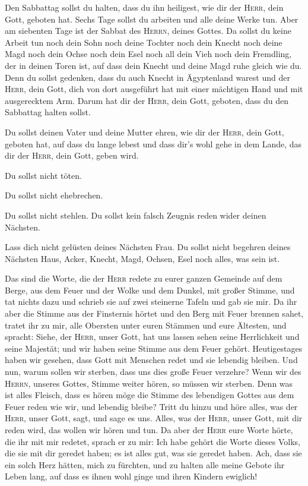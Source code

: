  Den Sabbattag sollst du halten, dass du ihn heiligest,
wie dir der \textsc{Herr}, dein Gott, geboten hat.  Sechs
Tage sollst du arbeiten und alle deine Werke tun.  Aber
am siebenten Tage ist der Sabbat des \textsc{Herrn}, deines Gottes. Da
sollst du keine Arbeit tun noch dein Sohn noch deine Tochter noch dein
Knecht noch deine Magd noch dein Ochse noch dein Esel noch all dein Vieh
noch dein Fremdling, der in deinen Toren ist, auf dass dein Knecht und
deine Magd ruhe gleich wie du.  Denn du sollst gedenken,
dass du auch Knecht in Ägyptenland warest und der \textsc{Herr}, dein
Gott, dich von dort ausgeführt hat mit einer mächtigen Hand und mit
ausgerecktem Arm. Darum hat dir der \textsc{Herr}, dein Gott, geboten,
dass du den Sabbattag halten sollst.

 Du sollst deinen Vater und deine Mutter ehren, wie dir
der \textsc{Herr}, dein Gott, geboten hat, auf dass du lange lebest und
dass dir's wohl gehe in dem Lande, das dir der \textsc{Herr}, dein Gott,
geben wird.

 Du sollst nicht töten.

 Du sollst nicht ehebrechen.

 Du sollst nicht stehlen.  Du sollst kein
falsch Zeugnis reden wider deinen Nächsten.

 Lass dich nicht gelüsten deines Nächsten Frau. Du sollst
nicht begehren deines Nächsten Haus, Acker, Knecht, Magd, Ochsen, Esel
noch alles, was sein ist.

 Das sind die Worte, die der \textsc{Herr} redete zu
eurer ganzen Gemeinde auf dem Berge, aus dem Feuer und der Wolke und dem
Dunkel, mit großer Stimme, und tat nichts dazu und schrieb sie auf zwei
steinerne Tafeln und gab sie mir.  Da ihr aber die Stimme
aus der Finsternis hörtet und den Berg mit Feuer brennen sahet, tratet
ihr zu mir, alle Obersten unter euren Stämmen und eure Ältesten,
 und spracht: Siehe, der \textsc{Herr}, unser Gott, hat
uns lassen sehen seine Herrlichkeit und seine Majestät; und wir haben
seine Stimme aus dem Feuer gehört. Heutigestages haben wir gesehen, dass
Gott mit Menschen redet und sie lebendig bleiben.  Und
nun, warum sollen wir sterben, dass uns dies große Feuer verzehre? Wenn
wir des \textsc{Herrn}, unseres Gottes, Stimme weiter hören, so müssen
wir sterben.  Denn was ist alles Fleisch, dass es hören
möge die Stimme des lebendigen Gottes aus dem Feuer reden wie wir, und
lebendig bleibe?  Tritt du hinzu und höre alles, was der
\textsc{Herr}, unser Gott, sagt, und sage es uns. Alles, was der
\textsc{Herr}, unser Gott, mit dir reden wird, das wollen wir hören und
tun.  Da aber der \textsc{Herr} eure Worte hörte, die ihr
mit mir redetet, sprach er zu mir: Ich habe gehört die Worte dieses
Volks, die sie mit dir geredet haben; es ist alles gut, was sie geredet
haben.  Ach, dass sie ein solch Herz hätten, mich zu
fürchten, und zu halten alle meine Gebote ihr Leben lang, auf dass es
ihnen wohl ginge und ihren Kindern ewiglich!

